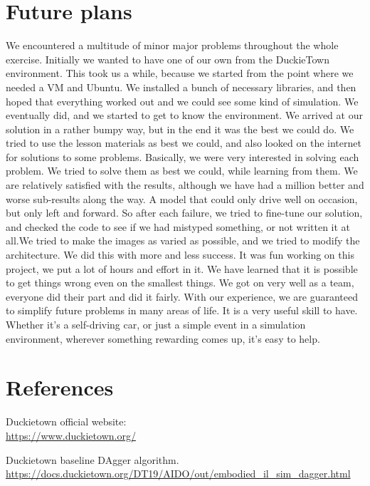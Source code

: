 \documentclass{article}
\begin{document}
\section*{Future plans}
We encountered a multitude of minor major problems throughout the whole exercise. Initially we wanted to have one of our own from the DuckieTown environment. This took us a while, because we started from the point where we needed a VM and Ubuntu. We installed a bunch of necessary libraries, and then hoped that everything worked out and we could see some kind of simulation.
We eventually did, and we started to get to know the environment. We arrived at our solution in a rather bumpy way, but in the end it was the best we could do. We tried to use the lesson materials as best we could, and also looked on the internet for solutions to some problems. Basically, we were very interested in solving each problem. We tried to solve them as best we could, while learning from them. We are relatively satisfied with the results, although we have had a million better and worse sub-results along the way. A model that could only drive well on occasion, but only left and forward. So after each failure, we tried to fine-tune our solution, and checked the code to see if we had mistyped something, or not written it at all.We tried to make the images as varied as possible, and we tried to modify the architecture. We did this with more and less success.  It was fun working on this project, we put a lot of hours and effort in it. We have learned that it is possible to get things wrong even on the smallest things. We got on very well as a team, everyone did their part and did it fairly. With our experience, we are guaranteed to simplify future problems in many areas of life. It is a very useful skill to have. Whether it's a self-driving car, or just a simple event in a simulation environment, wherever something rewarding comes up, it's easy to help.
\pagebreak


\section*{References}
\vspace*{1\baselineskip}

Duckietown official website:
\\
\url{https://www.duckietown.org/}
\vspace*{1\baselineskip}

Duckietown baseline DAgger algorithm.
\\
\url{https://docs.duckietown.org/DT19/AIDO/out/embodied_il_sim_dagger.html}
\vspace*{1\baselineskip}
\end{document}
